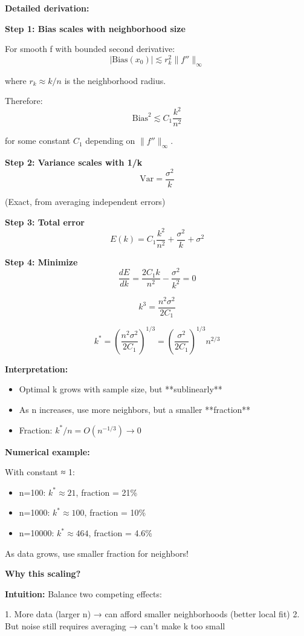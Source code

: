 \documentclass[12pt]{article}
\begin{document}
\begin{explanation}
\textbf{Detailed derivation:}

\textbf{Step 1: Bias scales with neighborhood size}

For smooth f with bounded second derivative:
\[
|\text{Bias}(x_0)| \lesssim r_k^2 \|f''\|_\infty
\]

where $r_k \approx k/n$ is the neighborhood radius.

Therefore:
\[
\text{Bias}^2 \lesssim C_1 \frac{k^2}{n^2}
\]

for some constant $C_1$ depending on $\|f''\|_\infty$.

\textbf{Step 2: Variance scales with 1/k}
\[
\text{Var} = \frac{\sigma^2}{k}
\]

(Exact, from averaging independent errors)

\textbf{Step 3: Total error}
\[
E(k) = C_1\frac{k^2}{n^2} + \frac{\sigma^2}{k} + \sigma^2
\]

\textbf{Step 4: Minimize}
\[
\frac{dE}{dk} = \frac{2C_1 k}{n^2} - \frac{\sigma^2}{k^2} = 0
\]

\[
k^3 = \frac{n^2 \sigma^2}{2C_1}
\]

\[
k^* = \left(\frac{n^2\sigma^2}{2C_1}\right)^{1/3} = \left(\frac{\sigma^2}{2C_1}\right)^{1/3} n^{2/3}
\]

\textbf{Interpretation:}

\begin{itemize}
    \item Optimal k grows with sample size, but **sublinearly**
    \item As n increases, use more neighbors, but a smaller **fraction**
    \item Fraction: $k^*/n = O(n^{-1/3}) \to 0$
\end{itemize}

\textbf{Numerical example:}

With constant ≈ 1:
\begin{itemize}
    \item n=100: $k^* \approx 21$, fraction = 21\%
    \item n=1000: $k^* \approx 100$, fraction = 10\%
    \item n=10000: $k^* \approx 464$, fraction = 4.6\%
\end{itemize}

As data grows, use smaller fraction for neighbors!

\textbf{Why this scaling?}

\textbf{Intuition:} Balance two competing effects:

1. More data (larger n) → can afford smaller neighborhoods (better local fit)
2. But noise still requires averaging → can't make k too small


\end{explanation}
\end{document}
